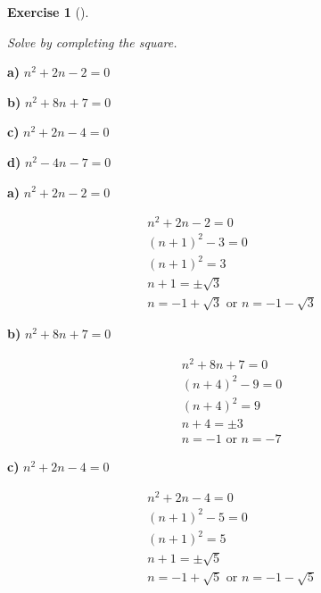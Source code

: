 \documentclass[
  letterpaper,
  DIV=11,
  numbers=noendperiod]{scrreprt}
\theoremstyle{definition}
\newtheorem{exercise}{Exercise}[chapter]
\theoremstyle{remark}
\begin{document}
\begin{exercise}[]\protect\hypertarget{exr-u6-16}{}\label{exr-u6-16}

\emph{Solve by completing the square.}

\textbf{a)} \(\displaystyle n^2 + 2n - 2 = 0\)

\textbf{b)} \(\displaystyle n^2 + 8n + 7 = 0\)

\textbf{c)} \(\displaystyle n^2 + 2n - 4 = 0\)

\textbf{d)} \(\displaystyle n^2 - 4n - 7 = 0\)

\begin{tcolorbox}[enhanced jigsaw, opacitybacktitle=0.6, coltitle=black, arc=.35mm, colframe=quarto-callout-tip-color-frame, colback=white, bottomrule=.15mm, left=2mm, colbacktitle=quarto-callout-tip-color!10!white, titlerule=0mm, opacityback=0, title=\textcolor{quarto-callout-tip-color}{\faLightbulb}\hspace{0.5em}{🔍 View Solutions}, leftrule=.75mm, breakable, rightrule=.15mm, bottomtitle=1mm, toptitle=1mm, toprule=.15mm]

\textbf{a)} \(\displaystyle n^2 + 2n - 2 = 0\)

\begin{align*}
n^2 + 2n - 2 = 0 \\ (n + 1)^2 - 3 = 0 \\ (n + 1)^2 = 3 \\ n + 1 = \pm \sqrt{3} \\ n = -1 + \sqrt{3} \text{ or } n = -1 - \sqrt{3}
\end{align*}

\textbf{b)} \(\displaystyle n^2 + 8n + 7 = 0\)

\begin{align*}
n^2 + 8n + 7 = 0 \\ (n + 4)^2 - 9 = 0 \\ (n + 4)^2 = 9 \\ n + 4 = \pm 3 \\ n = -1 \text{ or } n = -7
\end{align*}

\textbf{c)} \(\displaystyle n^2 + 2n - 4 = 0\)

\begin{align*}
n^2 + 2n - 4 = 0 \\ (n + 1)^2 - 5 = 0 \\ (n + 1)^2 = 5 \\ n + 1 = \pm \sqrt{5} \\ n = -1 + \sqrt{5} \text{ or } n = -1 - \sqrt{5}
\end{align*}


\end{tcolorbox}
\end{exercise}
\end{document}
